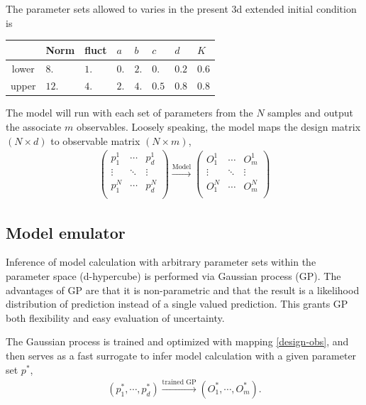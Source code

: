 \documentclass[aps,prl,twocolumn,groupedaddress]{revtex4-1}
\begin{document}
	The parameter sets allowed to varies in the present 3d extended initial condition is 
	\begin{center}
	\begin{tabularx}{0.45\textwidth}{c*{7}{Y}}
		\toprule[1pt]
		 & Norm	& fluct	& $a$ & $b$ & $c$ & $d$ & $K$ \\
		\midrule[0.5pt]
		lower & $8.$		&  $1.$	&	$0.$&	 $2.$ & $0.$ & $0.2$ & $0.6$ \\
		upper	& $12.$		&  $4.$	&	$2.$& $4.$ & $0.5$ & $0.8$ & $0.8$ \\
		\bottomrule[1pt]
	\end{tabularx}\label{parameter}
	\end{center}
	The model will run with each set of parameters from the $N$ samples and output the associate $m$ observables. Loosely speaking, the model maps the design matrix $(N \times d)$ to observable matrix $(N \times m)$,
	\begin{eqnarray}\label{design-obs}
	\left(\begin{array}{ccc}
	p_{1}^{1}  & \cdots & p_{d}^{1}\\
	\vdots  & \ddots & \vdots\\
	p_{1}^{N}  & \cdots & p_{d}^{N}\\
	\end{array}\right)
	\xrightarrow{\textrm{Model}} 
	\left(\begin{array}{ccc}
	O_{1}^{1}  & \cdots & O_{m}^{1}\\
	\vdots  & \ddots & \vdots\\
	O_{1}^{N}  & \cdots & O_{m}^{N}\\
	\end{array}\right)
	\end{eqnarray}
	
	\subsection{Model emulator}
	Inference of model calculation with arbitrary parameter sets within the parameter space (d-hypercube) is performed via Gaussian process (GP). 
	The advantages of GP are that it is non-parametric and that the result is a likelihood distribution of prediction instead of a single valued prediction. 
	This grants GP both flexibility and easy evaluation of uncertainty.
	
	 The Gaussian process is trained and optimized with mapping \ref{design-obs}, and then serves as a fast surrogate to infer model calculation with a given parameter set $p^*$,
	 \begin{eqnarray}
	 	(p^*_1, \cdots, p^*_d) \xrightarrow{\textrm{trained GP}} (O^*_1, \cdots, O^*_m).
	 \end{eqnarray}
	 
\end{document}

